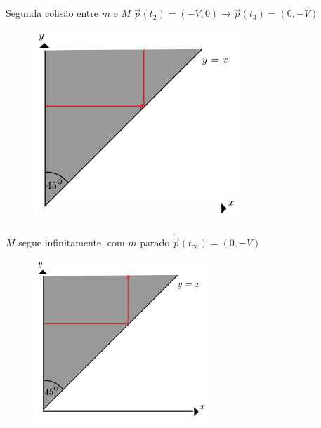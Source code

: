 \documentclass{beamer}
\begin{document}
\begin{frame}{Segunda colisão entre $m$ e $M$}
  $\dot{\vec{p}}(t_2)=(-V,0)\to\dot{\vec{p}}(t_3)=(0,-V)$
  \begin{figure}
    \centering
    \includegraphics[width=0.7\textwidth]{images/image1-4.png}
  \end{figure}
\end{frame}

\begin{frame}{$M$ segue infinitamente, com $m$ parado}
  $\dot{\vec{p}}(t_{\infty})=(0,-V)$
  \begin{figure}
    \centering
    \includegraphics[width=0.6\textwidth]{images/image1-5.png}
  \end{figure}
\end{frame}
\end{document}
